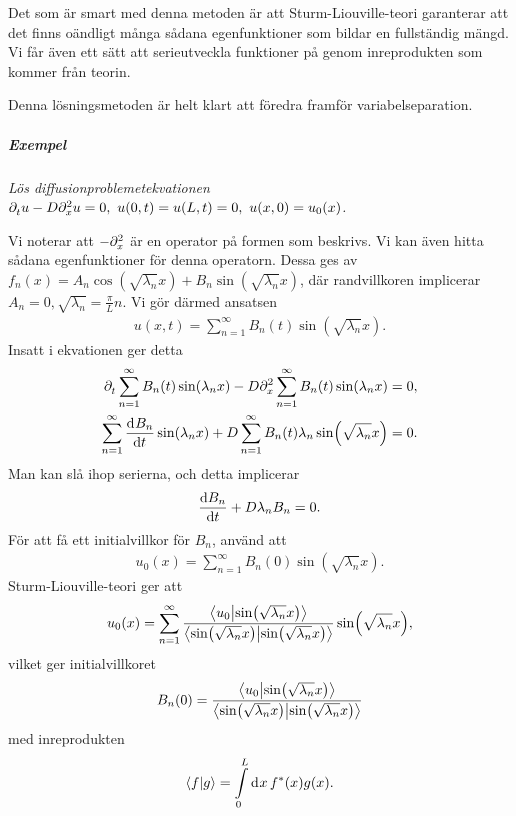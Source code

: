 Det som är smart med denna metoden är att Sturm-Liouville-teori garanterar att det finns oändligt många sådana egenfunktioner som bildar en fullständig mängd. Vi får även ett sätt att serieutveckla funktioner på genom inreprodukten som kommer från teorin.

Denna lösningsmetoden är helt klart att föredra framför variabelseparation.

\subparagraph{Exempel}
\textit{
Lös diffusionproblemetekvationen $\del{t}u - D\del[2]{x}u = 0,\ u(0, t) = u(L, t) = 0,\ u(x, 0) = u_{0}(x)$.
}

Vi noterar att $-\del[2]{x}{}$ är en operator på formen som beskrivs. Vi kan även hitta sådana egenfunktioner för denna operatorn. Dessa ges av $f_{n}(x) = A_{n}\cos(\sqrt{\lambda_{n}}x) + B_{n}\sin(\sqrt{\lambda_{n}}x)$, där randvillkoren implicerar $A_{n} = 0, \sqrt{\lambda_{n}} = \frac{\pi}{L}n$. Vi gör därmed ansatsen
\begin{align*}
	u(x, t) = \sum\limits_{n = 1}^{\infty}B_{n}(t)\sin(\sqrt{\lambda_{n}}x).
\end{align*}
Insatt i ekvationen ger detta
\begin{align*}
	\del{t}{\sum\limits_{n = 1}^{\infty}B_{n}(t)\sin(\lambda_{n}x)} - D\del[2]{x}{\sum\limits_{n = 1}^{\infty}B_{n}(t)\sin(\lambda_{n}x)}     &= 0, \\
	\sum\limits_{n = 1}^{\infty}\deval{B_{n}}{t}{t}\sin(\lambda_{n}x) + D\sum\limits_{n = 1}^{\infty}B_{n}(t)\lambda_{n}\sin(\sqrt{\lambda_{n}}x) &= 0.
\end{align*}
Man kan slå ihop serierna, och detta implicerar
\begin{align*}
	\dv{B_{n}}{t} + D\lambda_{n}B_{n} = 0.
\end{align*}
För att få ett initialvillkor för $B_{n}$, använd att
\begin{align*}
	u_{0}(x) = \sum\limits_{n = 1}^{\infty}B_{n}(0)\sin(\sqrt{\lambda_{n}}x).
\end{align*}
Sturm-Liouville-teori ger att
\begin{align*}
	u_{0}(x) = \sum\limits_{n = 1}^{\infty}\frac{\inprod{u_{0}}{\sin(\sqrt{\lambda_{n}}x)}}{\inprod{\sin(\sqrt{\lambda_{n}}x)}{\sin(\sqrt{\lambda_{n}}x)}}\sin(\sqrt{\lambda_{n}}x),
\end{align*}
vilket ger initialvillkoret
\begin{align*}
	B_{n}(0) = \frac{\inprod{u_{0}}{\sin(\sqrt{\lambda_{n}}x)}}{\inprod{\sin(\sqrt{\lambda_{n}}x)}{\sin(\sqrt{\lambda_{n}}x)}}
\end{align*}
med inreprodukten
\begin{align*}
	\inprod{f}{g} = \inteval{0}{L}{x}{\cc{f}(x)g(x)}.
\end{align*}

